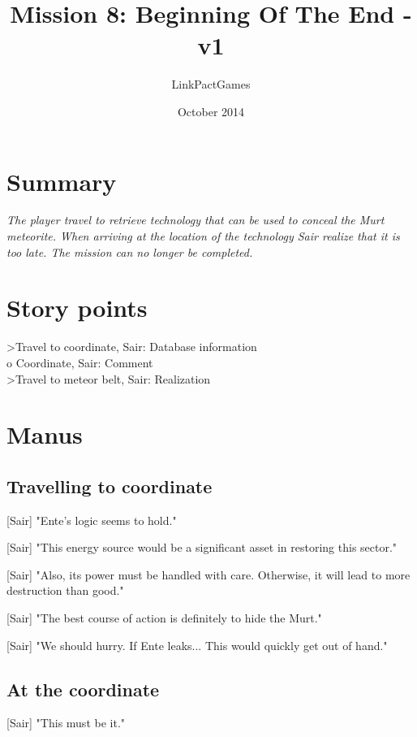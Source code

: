 \documentclass[a4paper,12pt]{article}
\begin{document}
\title{Mission 8: Beginning Of The End - v1}
\author{LinkPactGames}
\date{October 2014}
\maketitle

\section{Summary}

\textit{The player travel to retrieve technology that can be used to conceal the Murt meteorite.
When arriving at the location of the technology Sair realize that it is too late. The mission can no
longer be completed.}

\section{Story points}

\textgreater Travel to coordinate, Sair: Database information\\
o Coordinate, Sair: Comment\\
\textgreater Travel to meteor belt, Sair: Realization

\section{Manus}

\subsection{Travelling to coordinate}

[Sair] "Ente's logic seems to hold." 

[Sair] "This energy source would be a significant asset in restoring this sector."

[Sair] "Also, its power must be handled with care. Otherwise, it will lead to more destruction than good."

[Sair] "The best course of action is definitely to hide the Murt."

[Sair] "We should hurry. If Ente leaks... This would quickly get out of hand."

\subsection{At the coordinate}

[Sair] "This must be it."
\end{document}
